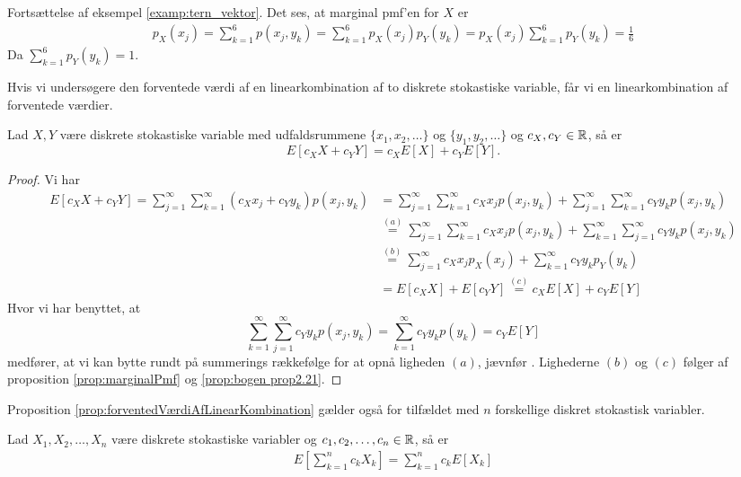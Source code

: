 \begin{exmp}
    Fortsættelse af  eksempel \ref{examp:tern_vektor}. Det ses, at marginal pmf'en for $X$ er 
    \begin{align*}
        p_X(x_j)=\sum_{k=1}^6 p(x_j,y_k)=\sum_{k=1}^6 p_X(x_j)p_Y(y_k) = p_X(x_j) \sum_{k=1}^6 p_Y(y_k)
        =\frac{1}{6}
    \end{align*}
    Da $\sum^6_{k = 1} p_Y(y_k) = 1$.
\end{exmp}

Hvis vi undersøgere den forventede værdi af en linearkombination af to diskrete stokastiske variable, får vi en linearkombination af forventede værdier.
\begin{prop}\label{prop:forventedVærdiAfLinearKombination} %
Lad $X, Y$ være diskrete stokastiske variable med udfaldsrummene $\{x_1, x_2, \ldots \}$ og $\{y_1, y_2, \ldots \}$ og $c_X, c_Y \in \mathbb{R}$, så er
\begin{equation*}
    E[c_XX+c_YY] = c_XE[X] + c_YE[Y].
\end{equation*}
\end{prop}

\begin{proof}
Vi har
\begin{align*}
    E[c_XX + c_YY] = \sum^\infty_{j = 1} \sum^\infty_{k = 1} (c_X x_j + c_Y y_k) p(x_j, y_k) &= \sum^\infty_{j = 1} \sum^\infty_{k = 1} c_X x_j p(x_j, y_k) + \sum^\infty_{j = 1} \sum^\infty_{k = 1} c_Y y_k p(x_j, y_k) \\
    &\stackrel{(a)}= \sum^\infty_{j = 1} \sum^\infty_{k = 1} c_X x_j p(x_j, y_k) + \sum^\infty_{k = 1} \sum^\infty_{j = 1} c_Y y_k p(x_j, y_k) \\
    &\stackrel{(b)}= \sum^\infty_{j = 1} c_X x_j p_X(x_j) + \sum^\infty_{k = 1} c_Y y_k p_Y(y_k)\\
    &= E[c_XX] +  E[c_YY] \stackrel{(c)}= c_X E[X] + c_Y E[Y]
\end{align*}
Hvor vi har benyttet, at 
\begin{equation*}
    \sum^\infty_{k = 1} \sum^\infty_{j = 1} c_Y y_k p(x_j, y_k) = \sum^\infty_{k = 1} c_Y y_k p(y_k) = c_YE[Y]
\end{equation*}
medfører, at vi kan bytte rundt på summerings rækkefølge for at opnå ligheden $(a)$, jævnfør \cite{horiaPowerSerieNoter}.
Lighederne $(b)$ og $(c)$ følger af proposition \ref{prop:marginalPmf} og \ref{prop:bogen prop2.21}.
\end{proof}

Proposition \ref{prop:forventedVærdiAfLinearKombination} gælder også for tilfældet med $n$ forskellige diskret stokastisk variabler.
\begin{cor}\label{cor:sumAfDiskreteVariable} %
Lad $X_1, X_2, \ldots, X_n$ være diskrete stokastiske variabler og $c_1, c_2, \ldots, c_n \in \mathbb{R}$, så er 
\begin{align*}
    E\left[\sum^n_{k = 1} c_k X_k\right] = \sum^n_{k = 1} c_k E[X_k]
\end{align*}
\end{cor}

